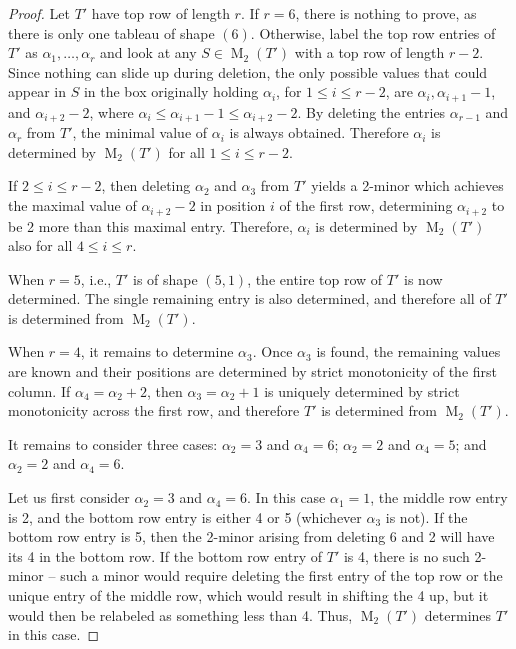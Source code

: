 \documentclass[12pt]{amsart}
\theoremstyle{definition}
\theoremstyle{remark}
\numberwithin{equation}{section}
\numberwithin{figure}{section}
\newcommand{\M}{\operatorname{M}}
\begin{document}
\begin{proof}
Let $T'$ have top row of length $r$. If $r=6$, there is nothing to prove, as there is only one tableau of shape $(6)$. Otherwise, label the top row entries of $T'$ as $\alpha_1, \ldots, \alpha_{r}$ and look at any $S \in \M_2(T')$ with a top row of length $r-2$. Since nothing can slide up during deletion, the only possible values that could appear in $S$ in the box originally holding $\alpha_i$, for $1 \leq i \leq r - 2$, are $\alpha_i, \alpha_{i+1} -1$, and $\alpha_{i+2} -2$, where $\alpha_i\le \alpha_{i+1} -1 \le \alpha_{i+2} -2$. By deleting the entries $\alpha_{r-1}$ and $\alpha_r$ from $T'$, the minimal value of $\alpha_i$ is always obtained. Therefore $\alpha_i$ is determined by $\M_2(T')$ for all $1 \leq i \leq r - 2$.

If $2 \leq i \leq r - 2$, then deleting $\alpha_{2}$ and $\alpha_{3}$ from $T'$ yields a 2-minor which achieves the maximal value of $\alpha_{i + 2} - 2$ in position $i$ of the first row, determining $\alpha_{i+2}$ to be 2 more than this maximal entry. Therefore, $\alpha_i$ is determined by $\M_2(T')$ also for all $4 \leq i \leq r$.

When $r=5$, i.e., $T'$ is of shape $(5,1)$, the entire top row of $T'$ is now determined. The single remaining entry is also determined, and therefore all of $T'$ is determined from $\M_2(T')$.

When $r=4$, it remains to determine $\alpha_3$. Once $\alpha_3$ is found, the remaining values are known and their positions are determined by strict monotonicity of the first column. If $\alpha_4=\alpha_2+2$,  then $\alpha_3=\alpha_2+1$ is uniquely determined by strict monotonicity across the first row, and therefore $T'$ is determined from $\M_2(T')$.

It remains to consider three cases: $\alpha_2=3$ and $\alpha_4=6$; $\alpha_2=2$ and $\alpha_4=5$; and $\alpha_2=2$ and $\alpha_4=6$.

Let us first consider $\alpha_2=3$ and $\alpha_4=6$. In this case $\alpha_1=1$, the middle row entry is 2, and the bottom row entry is either 4 or 5 (whichever $\alpha_3$ is not). If the bottom row entry is 5, then the 2-minor arising from deleting 6 and 2 will have its 4 in the bottom row. If the bottom row entry of $T'$ is 4, there is no such 2-minor -- such a minor would require deleting the first entry of the top row or the unique entry of the middle row, which would result in shifting the 4 up, but it would then be relabeled as something less than 4. Thus, $\M_2(T')$ determines $T'$ in this case.


\end{proof}
\end{document}
